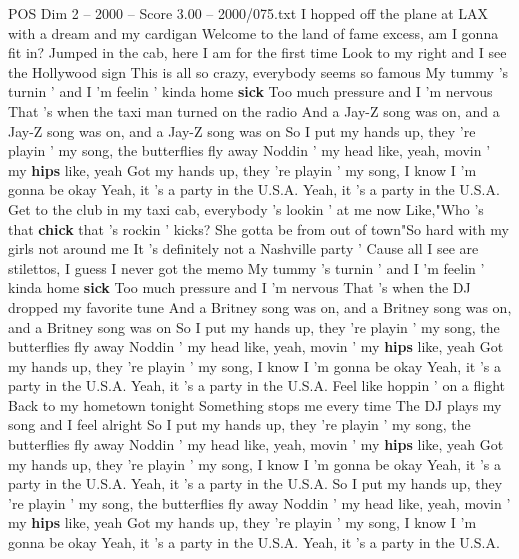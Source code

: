 \begin{textsample}{POS Dim 2 – 2000 – Score 3.00 – 2000/075.txt}  \label{ex:f2_pos_002}
I hopped off the plane at LAX with a dream and my cardigan Welcome to the land of fame excess, am I gonna fit in?
Jumped in the cab, here I am for the first time Look to my right and I see the Hollywood sign This is all so crazy, everybody seems so famous My tummy 's turnin ' and I 'm feelin ' kinda home \textbf{sick} Too much pressure and I 'm nervous That 's when the taxi man turned on the radio And a Jay-Z song was on, and a Jay-Z song was on, and a Jay-Z song was on So I put my hands up, they 're playin ' my song, the butterflies fly away Noddin ' my head like, yeah, movin ' my \textbf{hips} like, yeah Got my hands up, they 're playin ' my song, I know I 'm gonna be okay Yeah, it 's a party in the U.S.A.
Yeah, it 's a party in the U.S.A.
Get to the club in my taxi cab, everybody 's lookin ' at me now Like,"Who 's that \textbf{chick} that 's rockin ' kicks?
She gotta be from out of town"So hard with my girls not around me It 's definitely not a Nashville party ' Cause all I see are stilettos, I guess I never got the memo My tummy 's turnin ' and I 'm feelin ' kinda home \textbf{sick} Too much pressure and I 'm nervous That 's when the DJ dropped my favorite tune And a Britney song was on, and a Britney song was on, and a Britney song was on So I put my hands up, they 're playin ' my song, the butterflies fly away Noddin ' my head like, yeah, movin ' my \textbf{hips} like, yeah Got my hands up, they 're playin ' my song, I know I 'm gonna be okay Yeah, it 's a party in the U.S.A.
Yeah, it 's a party in the U.S.A.
Feel like hoppin ' on a flight Back to my hometown tonight Something stops me every time The DJ plays my song and I feel alright So I put my hands up, they 're playin ' my song, the butterflies fly away Noddin ' my head like, yeah, movin ' my \textbf{hips} like, yeah Got my hands up, they 're playin ' my song, I know I 'm gonna be okay Yeah, it 's a party in the U.S.A.
Yeah, it 's a party in the U.S.A.
So I put my hands up, they 're playin ' my song, the butterflies fly away Noddin ' my head like, yeah, movin ' my \textbf{hips} like, yeah Got my hands up, they 're playin ' my song, I know I 'm gonna be okay Yeah, it 's a party in the U.S.A.
Yeah, it 's a party in the U.S.A.

\end{textsample}
